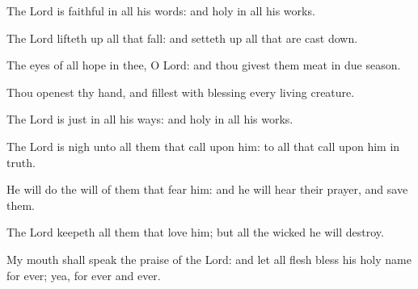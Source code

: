 ﻿\item The Lord is faithful in all his words: and holy in all his works.
\item The Lord lifteth up all that fall: and setteth up all that are cast down.
\item The eyes of all hope in thee, O Lord: and thou givest them meat in due season.
\item Thou openest thy hand, and fillest with blessing every living creature.
\item The Lord is just in all his ways: and holy in all his works.
\item The Lord is nigh unto all them that call upon him: to all that call upon him in truth.
\item He will do the will of them that fear him: and he will hear their prayer, and save them.
\item The Lord keepeth all them that love him; but all the wicked he will destroy.
\item My mouth shall speak the praise of the Lord: and let all flesh bless his holy name for ever; yea, for ever and ever.